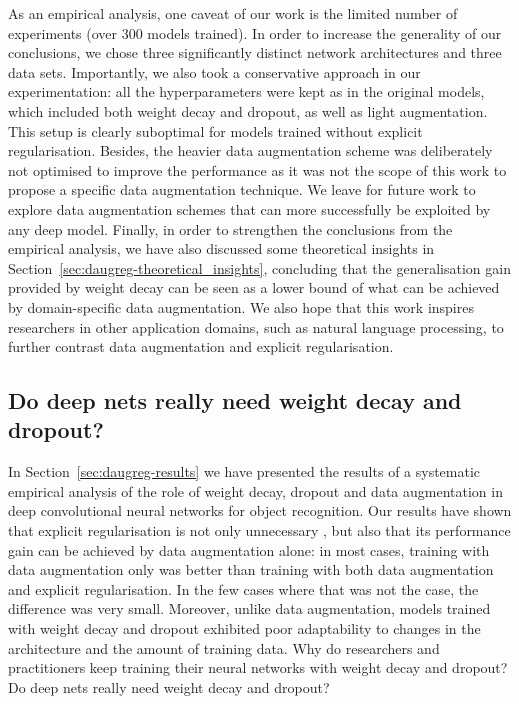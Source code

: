 {As an empirical analysis, one caveat of our work is the limited number of experiments (over 300 models trained). In order to increase the generality of our conclusions, we chose three significantly distinct network architectures and three data sets. Importantly, we also took a conservative approach in our experimentation: all the hyperparameters were kept as in the original models, which included both weight decay and dropout, as well as light augmentation. This setup is clearly suboptimal for models trained without explicit regularisation. Besides, the heavier data augmentation scheme was deliberately not optimised to improve the performance as it was not the scope of this work to propose a specific data augmentation technique. We leave for future work to explore data augmentation schemes that can more successfully be exploited by any deep model. Finally, in order to strengthen the conclusions from the empirical analysis, we have also discussed some theoretical insights in Section~\ref{sec:daugreg-theoretical_insights}, concluding that the generalisation gain provided by weight decay can be seen as a lower bound of what can be achieved by domain-specific data augmentation. We also hope that this work inspires researchers in other application domains, such as natural language processing, to further contrast data augmentation and explicit regularisation.

\subsection{Do deep nets really need weight decay and dropout?}
\label{sec:daug_vs_reg-wd_drop}
In Section~\ref{sec:daugreg-results} we have presented the results of a systematic empirical analysis of the role of weight decay, dropout and data augmentation in deep convolutional neural networks for object recognition. Our results have shown that explicit regularisation is not only unnecessary \citep{zhang2016understandingdl}, but also that its performance gain can be achieved by data augmentation alone: in most cases, training with data augmentation only was better than training with both data augmentation and explicit regularisation. In the few cases where that was not the case, the difference was very small. Moreover, unlike data augmentation, models trained with weight decay and dropout exhibited poor adaptability to changes in the architecture and the amount of training data. Why do researchers and practitioners keep training their neural networks with weight decay and dropout? Do deep nets really need weight decay and dropout?

}
